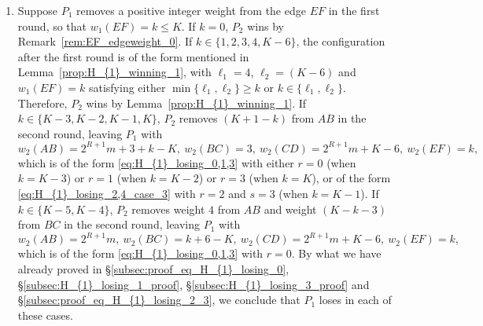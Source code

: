 \documentclass[11pt,reqno]{amsart}
\theoremstyle{definition}
\theoremstyle{definition}
\begin{document}
\begin{enumerate}
\begin{enumerate}
\item Finally, if $w_{1}(AB)=2^{R+1}n+\ell_{1}$ for some $n<m$ and $\ell_{1}\in\{0,1,\ldots,2^{R+1}-1\}$, the configuration after the first round is of the form given by Lemma~\ref{prop:H_{1}_winning_1} with $m_{1}=n$, $m_{2}=m$ and $\ell_{2}=K-6$. Since $n<m \implies m_{1}\neq m_{2}$, $P_{2}$ wins by Lemma~\ref{prop:H_{1}_winning_1}.
\end{enumerate}

\item Suppose $P_{1}$ removes a positive integer weight from the edge $EF$ in the first round, so that $w_{1}(EF)=k\leqslant K$. If $k=0$, $P_{2}$ wins by Remark~\ref{rem:EF_edgeweight_0}. If $k \in \{1,2,3,4,K-6\}$, the configuration after the first round is of the form mentioned in Lemma~\ref{prop:H_{1}_winning_1}, with $\ell_{1}=4$, $\ell_{2}=(K-6)$ and $w_{1}(EF)=k$ satisfying either $\min\{\ell_{1},\ell_{2}\}\geqslant k$ or $k \in \{\ell_{1},\ell_{2}\}$. Therefore, $P_{2}$ wins by Lemma~\ref{prop:H_{1}_winning_1}. If $k \in \{K-3,K-2,K-1,K\}$, $P_{2}$ removes $(K+1-k)$ from $AB$ in the second round, leaving $P_{1}$ with 
\begin{equation}
w_{2}(AB)=2^{R+1}m+3+k-K,\ w_{2}(BC)=3,\ w_{2}(CD)=2^{R+1}m+K-6,\ w_{2}(EF)=k,\nonumber
\end{equation}
which is of the form \eqref{eq:H_{1}_losing_0,1,3} with either $r=0$ (when $k=K-3$) or $r=1$ (when $k=K-2$) or $r=3$ (when $k=K$), or of the form \eqref{eq:H_{1}_losing_2,4_case_3} with $r=2$ and $s=3$ (when $k=K-1$). If $k \in \{K-5,K-4\}$, $P_{2}$ removes weight $4$ from $AB$ and weight $(K-k-3)$ from $BC$ in the second round, leaving $P_{1}$ with
\begin{equation}
w_{2}(AB)=2^{R+1}m,\ w_{2}(BC)=k+6-K,\ w_{2}(CD)=2^{R+1}m+K-6,\ w_{2}(EF)=k,\nonumber
\end{equation}
which is of the form \eqref{eq:H_{1}_losing_0,1,3} with $r=0$. By what we have already proved in \S\ref{subsec:proof_eq_H_{1}_losing_0}, \S\ref{subsec:H_{1}_losing_1_proof}, \S\ref{subsec:H_{1}_losing_3_proof} and \S\ref{subsec:proof_eq_H_{1}_losing_2_3}, we conclude that $P_{1}$ loses in each of these cases.


\end{enumerate}
\end{document}
